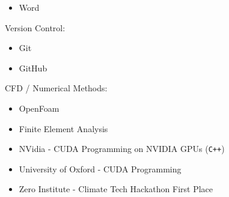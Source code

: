 \documentclass{cv}
\begin{document}
\begin{minipage}[t]{0.3\textwidth}
\begin{itemize}[font=\cvlargesz]
		\item Word
	\end{itemize}
	\vspace{15pt}
	\cvlargesz Version Control:
	\begin{itemize}[font=\cvlargesz]
		\item Git
		\item GitHub
	\end{itemize}
	\vspace{15pt}
	\cvlargesz CFD / Numerical Methods:
	\begin{itemize}[font=\cvlargesz]
		\item OpenFoam
		\item Finite Element Analysis
	\end{itemize}
	\vspace{10pt}
	\begin{itemize}
		\item NVidia - CUDA Programming on NVIDIA GPUs (\texttt{C++})
		\item University of Oxford - CUDA Programming 
		\item Zero Institute - Climate Tech Hackathon First Place
	\end{itemize}
\end{minipage}
\end{document}
